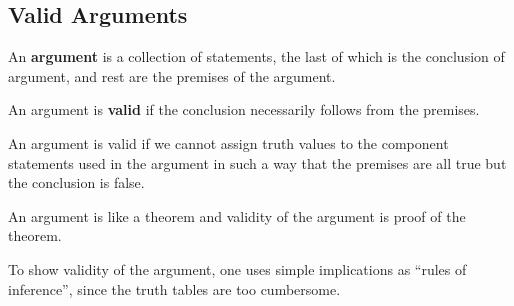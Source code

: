 \documentclass[]{article}
\begin{document}
\subsection{Valid Arguments}
\begin{defn}[Argument] An \textbf{argument} is a collection of statements, the last of which is the conclusion of argument, and rest are the premises of the argument.
\end{defn}
\begin{defn}[Validity] An argument is \textbf{valid} if the conclusion necessarily follows from the premises.
\end{defn}
\begin{rem} An argument is valid if we cannot assign truth values to the component statements used in the argument in such a way that the premises are all true but the conclusion is false.
\end{rem}
\begin{rem} An argument is like a theorem and validity of the argument is proof of the theorem.
\end{rem}
\begin{rem} To show validity of the argument, one uses simple implications as ``rules of inference'', since the truth tables are too cumbersome.
\end{rem}
\end{document}
